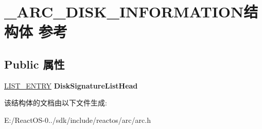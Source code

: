 \hypertarget{struct___a_r_c___d_i_s_k___i_n_f_o_r_m_a_t_i_o_n}{}\section{\+\_\+\+A\+R\+C\+\_\+\+D\+I\+S\+K\+\_\+\+I\+N\+F\+O\+R\+M\+A\+T\+I\+O\+N结构体 参考}
\label{struct___a_r_c___d_i_s_k___i_n_f_o_r_m_a_t_i_o_n}
\subsection*{Public 属性}
\begin{DoxyCompactItemize}
\item 
\mbox{\label{struct___a_r_c___d_i_s_k___i_n_f_o_r_m_a_t_i_o_n_a0380ae09cf03f7b8501ea12891a0156c}} 
\hyperlink{struct___l_i_s_t___e_n_t_r_y}{L\+I\+S\+T\+\_\+\+E\+N\+T\+RY} {\bfseries Disk\+Signature\+List\+Head}
\end{DoxyCompactItemize}


该结构体的文档由以下文件生成\+:\begin{DoxyCompactItemize}
\item 
E\+:/\+React\+O\+S-\/0../sdk/include/reactos/arc/arc.\+h\end{DoxyCompactItemize}
